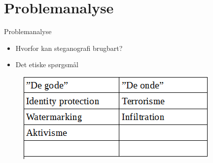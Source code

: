 \section{Problemanalyse}
\begin{frame}{Problemanalyse}{}
	\begin{itemize}
		\item Hvorfor kan steganografi brugbart?
		\item Det etiske spørgsmål
	\end{itemize}
	\begin{figure}[!H]
			\centering
			\includegraphics[width=.55\textwidth]{./Tessa/tabel.png}
	\end{figure}
\end{frame}


